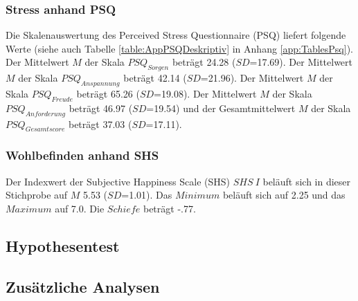 \subsubsection{Stress anhand PSQ}
Die Skalenauswertung des Perceived Stress Questionnaire (PSQ) liefert folgende Werte (siehe auch Tabelle \ref{table:AppPSQDeskriptiv} in Anhang \ref{app:TablesPsq}). Der Mittelwert $M$ der Skala $PSQ_{Sorgen}$ beträgt 24.28 ($SD$=17.69). Der Mittelwert $M$ der Skala $PSQ_{Anspannung}$ beträgt 42.14 ($SD$=21.96). Der Mittelwert $M$ der Skala $PSQ_{Freude}$ beträgt 65.26 ($SD$=19.08). Der Mittelwert $M$ der Skala $PSQ_{Anforderung}$ beträgt 46.97 ($SD$=19.54) und der Gesamtmittelwert $M$ der Skala $PSQ_{Gesamtscore}$ beträgt 37.03 ($SD$=17.11).


\subsubsection{Wohlbefinden anhand SHS}
Der Indexwert der Subjective Happiness Scale (SHS) $SHS~I$ beläuft sich in dieser Stichprobe auf $M$ 5.53 ($SD$=1.01). Das $Minimum$ beläuft sich auf 2.25 und das $Maximum$ auf 7.0. Die $Schiefe$ beträgt -.77.

\subsection{Hypothesentest} \label{sec:Hypothesentest}

\subsection{Zusätzliche Analysen} \label{sec:ZusätzlicheAnalysen}